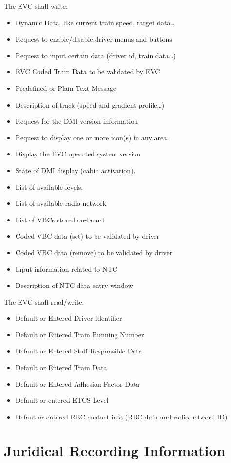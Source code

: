 \documentclass{template/openetcs_article}
\begin{document}
		The EVC shall write:
		\begin{itemize}
			\item Dynamic Data, like current train speed, target data…
			\item Request to enable/disable driver menus and buttons
			\item Request to input certain data (driver id, train data…)
			\item EVC Coded Train Data to be validated by EVC
			\item Predefined or Plain Text Message
			\item Description of track (speed and gradient profile…)
			\item Request for the DMI version information
			\item Request to display one or more icon(s) in any area.
			\item Display the EVC operated system version
			\item State of DMI display (cabin activation).
			\item List of available levels.
			\item List of available radio network
			\item List of VBCs stored on-board
			\item Coded VBC data (set) to be validated by driver
			\item Coded VBC data (remove) to be validated by driver
			\item Input information related to NTC
			\item Description of NTC data entry window
		\end{itemize}
			
		The EVC shall read/write:
		\begin{itemize}
			\item Default or Entered Driver Identifier
			\item Default or Entered Train Running Number
			\item Default or Entered Staff Responsible Data
			\item Default or Entered Train Data 
			\item Default or Entered Adhesion Factor Data
			\item Default or entered ETCS Level
			\item Defaut or entered RBC contact info (RBC data and radio network ID)
		\end{itemize}

\section{Juridical Recording Information}
\end{document}
